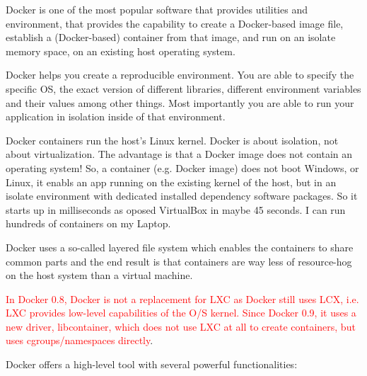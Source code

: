 \begin{mdframed}
Docker is one of the most popular software that provides utilities and
environment, that provides the capability to create a Docker-based image file,
establish a (Docker-based) container from that image, and run on an isolate
memory space, on an existing host operating system.
 
Docker helps you create a reproducible environment. You are able to specify the
specific OS, the exact version of different libraries, different environment
variables and their values among other things. Most importantly you are able to
run your application in isolation inside of that environment.


Docker containers run the host’s Linux kernel. Docker is about isolation, not
about virtualization. The advantage is that a Docker image does not contain an
operating system! So, a container (e.g. Docker image) does not boot Windows, or
Linux, it enabls an app running on the existing kernel of the host, but in an
isolate environment with dedicated installed dependency software packages.
So it starts up in milliseconds as oposed VirtualBox in maybe 45 seconds. I can
run hundreds of containers on my Laptop.




Docker uses a so-called layered file system which enables the containers to
share common parts and the end result is that containers are way less of
resource-hog on the host system than a virtual machine.


\end{mdframed}

\textcolor{red}{In Docker 0.8, Docker is not a replacement for LXC as Docker
still uses LCX, i.e. LXC provides low-level capabilities of the O/S kernel.
Since Docker 0.9, it uses a new driver, libcontainer, which does not use LXC at
all to create containers, but uses cgroups/namespaces directly}. 

Docker offers a high-level tool with several powerful functionalities:

